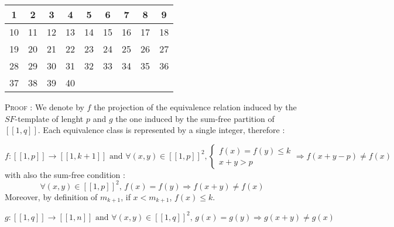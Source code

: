 \begin{center}
\begin{tabular}{|*{9}{c|}}
	\hline
	\cellcolor{red} 1 & \cellcolor{green} 2 & \cellcolor{green} 3 & \cellcolor{red} 4 & \cellcolor{blue} 5 & \cellcolor{blue} 6 & \cellcolor{blue} 7 & \cellcolor{blue} 8 & \cellcolor{blue} 9\\
	\hline
	\cellcolor{red} 10 & \cellcolor{green} 11 & \cellcolor{green} 12 & \cellcolor{red} 13 & \cellcolor{yellow} 14 & \cellcolor{yellow} 15 & \cellcolor{yellow} 16 & \cellcolor{yellow} 17 & \cellcolor{yellow} 18\\
	\hline
	\cellcolor{red} 19 & \cellcolor{green} 20 & \cellcolor{green} 21 & \cellcolor{red} 22 & \cellcolor{yellow} 23 & \cellcolor{yellow} 24 & \cellcolor{yellow} 25 & \cellcolor{yellow} 26 & \cellcolor{yellow} 27\\
	\hline
	\cellcolor{red} 28 & \cellcolor{green} 29 & \cellcolor{green} 30 & \cellcolor{red} 31 & \cellcolor{blue} 32 & \cellcolor{blue} 33 & \cellcolor{blue} 34 & \cellcolor{blue} 35 & \cellcolor{blue} 36 \\
	\hline
	\cellcolor{red} 37 & \cellcolor{green} 38 & \cellcolor{green} 39 & \cellcolor{red} 40 & & & & &\\
	\hline
\end{tabular}
\end{center}

\textsc{Proof :} We denote by \(f\) the projection of the equivalence relation induced by the \(SF\)-template of lenght
\(p\)
and \(g\) the one induced by the sum-free partition of \([\![1,q]\!]\). Each equivalence class is represented by a
single integer, therefore :

\[ f : [\![1,p]\!] \longrightarrow [\![1,k+1]\!] \text{ and } \forall (x,y) \in [\![1,p]\!]^2, \left\{
\begin{array}{ll}
	f(x) = f(y) \leqslant k \\
	x + y > p
\end{array}
\right.
\Longrightarrow f(x+y-p) \neq f(x)
\]
with also the sum-free condition : \[ \forall (x,y) \in [\![1,p]\!]^2 \text{, } f(x) = f(y)
\Longrightarrow f(x+y) \neq f(x) \]
Moreover, by definition of \(m_{k+1}\), if \(x < m_{k+1}\), \(f(x) \leqslant k\).

\[g : [\![1,q]\!] \longrightarrow [\![1,n]\!] \text{ and } \forall (x,y) \in [\![1,q]\!]^2 \text{, } g(x) = g(y)
\Longrightarrow g(x+y) \neq g(x)
\]

